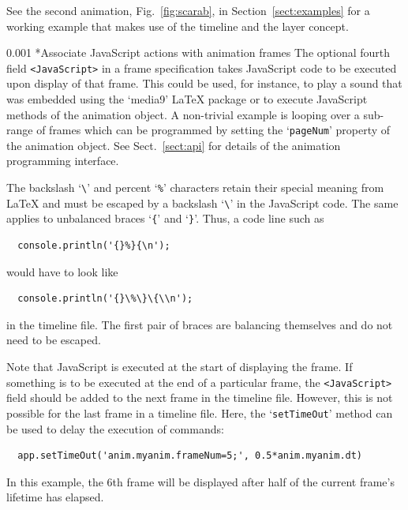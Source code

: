 \documentclass[a4paper]{article}
\makeatletter
\newcommand\myparagraph{\@startsection{paragraph}{3}{\z@}%
                                     {\parskip}%
                                     {0.001\parskip}%
                                     {\itshape\normalsize}}
\makeatother
\begin{document}
%

See the second animation, Fig.~\ref{fig:scarab}, in Section~\ref{sect:examples} for a working example that makes use of the timeline and the layer concept.

\myparagraph*{Associate JavaScript actions with animation frames}\label{sect:jsfield}
The optional fourth field \verb+<JavaScript>+ in a frame specification takes JavaScript code to be executed upon display of that frame. This could be used, for instance, to play a sound that was embedded using the `media9' \LaTeX{} package \cite{media9} or to execute JavaScript methods of the animation object. A non-trivial example is looping over a sub-range of frames which can be programmed by setting the `\verb+pageNum+' property of the animation object. See Sect.~\ref{sect:api} for details of the animation programming interface.

The backslash `\verb+\+' and percent `\verb+%+' characters retain their special meaning from \LaTeX{} and must be escaped by a backslash `\verb+\+' in the JavaScript code. The same applies to unbalanced braces `\verb+{+' and `\verb+}+'. Thus, a code line such as
\begin{verbatim}
  console.println('{}%}{\n');
\end{verbatim}
would have to look like
\begin{verbatim}
  console.println('{}\%\}\{\\n'); 
\end{verbatim}
in the timeline file. The first pair of braces are balancing themselves and do not need to be escaped.

Note that JavaScript is executed at the start of displaying the frame. If something is to be executed at the end of a particular frame, the \verb+<JavaScript>+ field should be added to the next frame in the timeline file. However, this is not possible for the last frame in a timeline file. Here, the `\verb+setTimeOut+' method can be used to delay the execution of commands:
\begin{verbatim}
  app.setTimeOut('anim.myanim.frameNum=5;', 0.5*anim.myanim.dt)
\end{verbatim}
In this example, the 6th frame will be displayed after half of the current frame's lifetime has elapsed.
\end{document}
